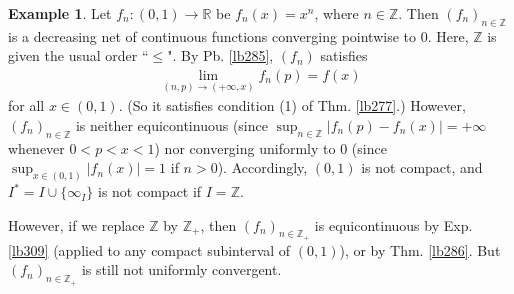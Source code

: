 \documentclass[12pt,b5paper,notitlepage]{article}
\theoremstyle{definition}
\newtheorem{eg}[df]{Example}
\theoremstyle{plain}
\newcommand{\Zbb}{\mathbb Z}
\newcommand{\Rbb}{\mathbb R}
\newcommand{\dps}{\displaystyle}
\numberwithin{equation}{section}
\begin{document}
\begin{eg}\label{lb401}
Let $f_n:(0,1)\rightarrow \Rbb$ be $f_n(x)=x^n$, where $n\in\Zbb$. Then $(f_n)_{n\in\Zbb}$ is a decreasing net of continuous functions converging pointwise to $0$. Here, $\Zbb$ is given the usual order ``$\leq$". By Pb. \ref{lb285}, $(f_n)$ satisfies
\begin{align*}
\lim_{(n,p)\rightarrow(+\infty,x)
}f_n(p)=f(x)
\end{align*}
for all $x\in (0,1)$. (So it satisfies condition (1) of Thm. \ref{lb277}.) However, $(f_n)_{n\in\Zbb}$ is neither equicontinuous (since $\sup_{n\in\Zbb}|f_n(p)-f_n(x)|=+\infty$ whenever $0<p<x<1$) nor converging uniformly to $0$ (since $\sup_{x\in (0,1)}|f_n(x)|=1$ if $n>0$). Accordingly, $(0,1)$ is not compact, and $I^*=I\cup\{\infty_I\}$ is not compact if $I=\Zbb$. 

However, if we replace $\Zbb$ by $\Zbb_+$, then $(f_n)_{n\in\Zbb_+}$ is equicontinuous by Exp. \ref{lb309} (applied to any compact subinterval of $(0,1)$), or by Thm. \ref{lb286}. But $(f_n)_{n\in\Zbb_+}$ is still not uniformly convergent. 
 \hfill\qedsymbol
\end{eg}




\begin{comment}


Let $g_n:[0,1]\rightarrow\Rbb$ be $g_n(x)=n^{-1}x^n$ if $n\neq0$. Equip $\Zbb^\times=\Zbb\setminus\{0\}$ with the usual order $\leq$. Then $(g_n)_{n\in\Zbb^\times}$ is a net of continuous functions converging pointwise to $0$, and is decreasing over $n$ when  $n\in\Zbb_+$.  Thus, by Pb. \ref{lb285}, for every $x\in[0,1]$, we have $\dps\lim_{(n,p)\rightarrow(+\infty,x)
}g_n(p)=g(x)$. Clearly $(g_n)_{n\in\Zbb^\times}$ converges uniformly to $0$. However, it is not hard to check that this net of functions is not equicontinuous. (The bad thing happens when $n<0$.) 


These examples indicate why condition (1) of Thm. \ref{lb277} or (1') of Prop. \ref{lb281} is more natural than ``equicontinuity + pointwise convergence": Condition (1') of Prop. \ref{lb281} can be viewed as a continuity condition which is not ``equi" over all $\alpha$ in the index set $I$, but is ``equi" for sufficiently large $\alpha$.
\end{comment}
\end{document}
